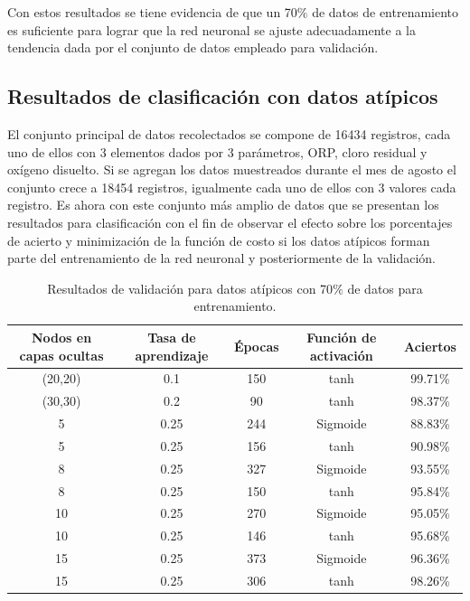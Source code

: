Con estos resultados se tiene evidencia de que un 70$\%$ de datos de entrenamiento es suficiente para lograr que la red neuronal se ajuste adecuadamente a la tendencia dada por el conjunto de datos empleado para validación.

\clearpage

\subsection{Resultados de clasificación con datos atípicos}

El conjunto principal de datos recolectados se compone de 16434 registros, cada uno de ellos con 3 elementos dados por 3 parámetros, ORP, cloro residual y oxígeno disuelto. Si se agregan los datos muestreados durante el 
mes de agosto el conjunto crece a 18454 registros, igualmente cada uno de ellos con 3 valores cada registro. Es ahora con este conjunto más amplio de datos que se presentan los resultados para clasificación con el fin de observar 
el efecto sobre los porcentajes de acierto y minimización de la función de costo si los datos atípicos forman parte del entrenamiento de la red neuronal y posteriormente de la validación.

\begin{table}[h]
	\begin{center}
		\begin{tabular}{| c | c | c | c | c |}
	    	\hline
            Nodos en capas ocultas & Tasa de aprendizaje & Épocas & Función de activación & Aciertos \\ \hline
			(20,20) & 0.1 & 150 & tanh & 99.71\% \\
			(30,30) & 0.2 & 90 & tanh & 98.37\% \\
			5 & 0.25 & 244 & Sigmoide & 88.83\% \\
			5 & 0.25 & 156 & tanh & 90.98\% \\
			8 & 0.25 & 327 & Sigmoide & 93.55\% \\
			8 & 0.25 & 150 & tanh & 95.84\% \\
			10 & 0.25 & 270 & Sigmoide & 95.05\% \\
			10 & 0.25 & 146 & tanh & 95.68\% \\
			15 & 0.25 & 373 & Sigmoide & 96.36\% \\
			15 & 0.25 & 306 & tanh & 98.26\% \\ \hline
	    \end{tabular}	
		\caption{Resultados de validación para datos atípicos con 70$\%$ de datos para entrenamiento.}
        \label{tab:table200_3}	
	\end{center}
\end{table}

